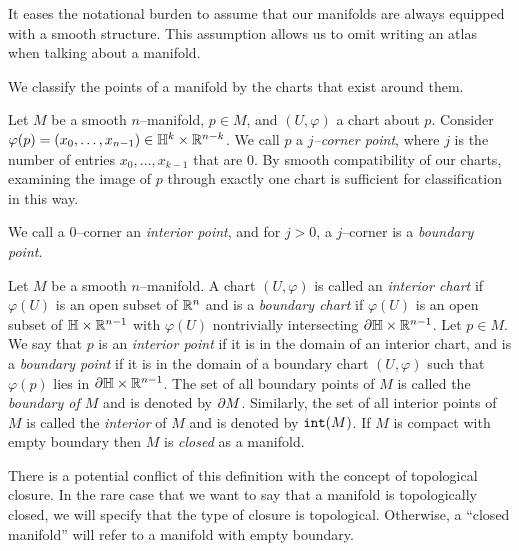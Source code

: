 It eases the notational burden to assume that our manifolds are always equipped with a smooth structure.
This assumption allows us to omit writing an atlas when talking about a manifold.

We classify the points of a manifold by the charts that exist around them.

\begin{defn}
	Let $M$ be a smooth $n$--manifold, $p\in M$, and $(U,\varphi)$ a chart about $p$.
	Consider $\varphi(p)=(x_0,\dots,x_{n-1})\in \mathbb{H}^k\times\mathbb{R}^{n-k}$.
	We call $p$ a \emph{$j$--corner point}, where $j$ is the number of entries $x_0,\dots,x_{k-1}$ that are 0.
	By smooth compatibility of our charts, examining the image of $p$ through exactly one chart is sufficient for classification in this way.
	
	We call a $0$--corner an \emph{interior point}, and for $j>0$, a $j$--corner is a \emph{boundary point}.	
\end{defn}
	
\begin{defn}[Boundary]
	\label{def:boundary}
	Let $M$ be a smooth $n$--manifold.
	A chart $(U,\varphi)$ is called an \emph{interior chart} if $\varphi(U)$ is an open subset of $\mathbb{R}^n$ and is a \emph{boundary chart} if $\varphi(U)$ is an open subset of $\mathbb{H}\times\mathbb{R}^{n-1}$ with $\varphi(U)$ nontrivially intersecting $\partial \mathbb{H}\times\mathbb{R}^{n-1}$.
	Let $p\in M$.
	We say that $p$ is an \emph{interior point} if it is in the domain of an interior chart, and is a \emph{boundary point} if it is in the domain of a boundary chart $(U,\varphi)$ such that $\varphi(p)$ lies in $\partial\mathbb{H}\times\mathbb{R}^{n-1}$.
	The set of all boundary points of $M$ is called the \emph{boundary of $M$} and is denoted by $\partial M$.
	Similarly, the set of all interior points of $M$ is called the \emph{interior} of $M$ and is denoted by $\mathtt{int}(M)$.
	If $M$ is compact with empty boundary then $M$ is \emph{closed} as a manifold.
\end{defn}

There is a potential conflict of this definition with the concept of topological closure.
In the rare case that we want to say that a manifold is topologically closed, we will specify that the type of closure is topological.
Otherwise, a ``closed manifold'' will refer to a manifold with empty boundary.

